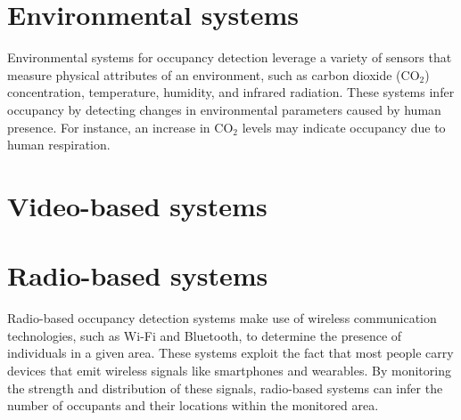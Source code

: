 

\section{Environmental systems}\label{sec:presence_env}
Environmental systems for occupancy detection leverage a variety of sensors that measure physical attributes of an environment, such as carbon dioxide ($\text{CO}_{2}$) concentration, temperature, humidity, and infrared radiation.
These systems infer occupancy by detecting changes in environmental parameters caused by human presence.
For instance, an increase in $\text{CO}_{2}$ levels may indicate occupancy due to human respiration.\cite{longoAccurateOccupancyEstimation2019}


\section{Video-based systems}\label{sec:presence_video}


\section{Radio-based systems}\label{sec:presence_radio}
Radio-based occupancy detection systems make use of wireless communication technologies, such as Wi-Fi and Bluetooth, to determine the presence of individuals in a given area.
These systems exploit the fact that most people carry devices that emit wireless signals like smartphones and wearables.
By monitoring the strength and distribution of these signals, radio-based systems can infer the number of occupants and their locations within the monitored area.\cite{longoAccurateOccupancyEstimation2019, teissedre-2019}


